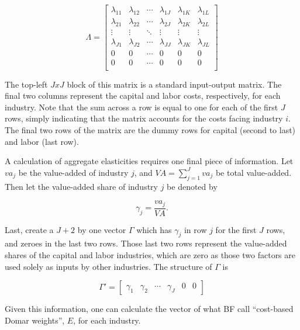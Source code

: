 \documentclass[11pt]{article}
\begin{document}
\begin{equation}
	\Lambda = 
	\begin{bmatrix}
		\lambda_{11} & \lambda_{12} & \cdots & \lambda_{1J} & \lambda_{1K} & \lambda_{1L} \\
		\lambda_{21} & \lambda_{22} & \cdots & \lambda_{2J} & \lambda_{2K} & \lambda_{2L} \\
		\vdots       & \vdots       & \ddots & \vdots       & \vdots       & \vdots  \\
		\lambda_{J1} & \lambda_{J2} & \cdots & \lambda_{JJ} & \lambda_{JK} & \lambda_{JL} \\
		0 & 0 & \cdots & 0 & 0& 0 \\
		0 & 0 & \cdots & 0 & 0& 0 \\
	\end{bmatrix}
\end{equation} \label{EQ_Lambda}

The top-left $JxJ$ block of this matrix is a standard input-output matrix. The final two columns represent the capital and labor costs, respectively, for each industry. Note that the sum across a row is equal to one for each of the first $J$ rows, simply indicating that the matrix accounts for the costs facing industry $i$. The final two rows of the matrix are the dummy rows for capital (second to last) and labor (last row).

A calculation of aggregate elasticities requires one final piece of information. Let $va_j$ be the value-added of industry $j$, and $VA = \sum_{j=1}^J va_j$ be total value-added. Then let the value-added share of industry $j$ be denoted by

\begin{equation}
	\gamma_j = \frac{va_j}{VA}.
\end{equation}

Last, create a $J+2$ by one vector $\Gamma$ which has $\gamma_j$ in row $j$ for the first $J$ rows, and zeroes in the last two rows. Those last two rows represent the value-added shares of the capital and labor industries, which are zero as those two factors are used solely as inputs by other industries. The structure of $\Gamma$ is

\begin{equation}
	\Gamma' = 
	\begin{bmatrix}
		\gamma_1 &
		\gamma_2 &
		\cdots &
		\gamma_J &
		0 &
		0
	\end{bmatrix}
\end{equation}

Given this information, one can calculate the vector of what BF call ``cost-based Domar weights'', $E$, for each industry. 
\end{document}
